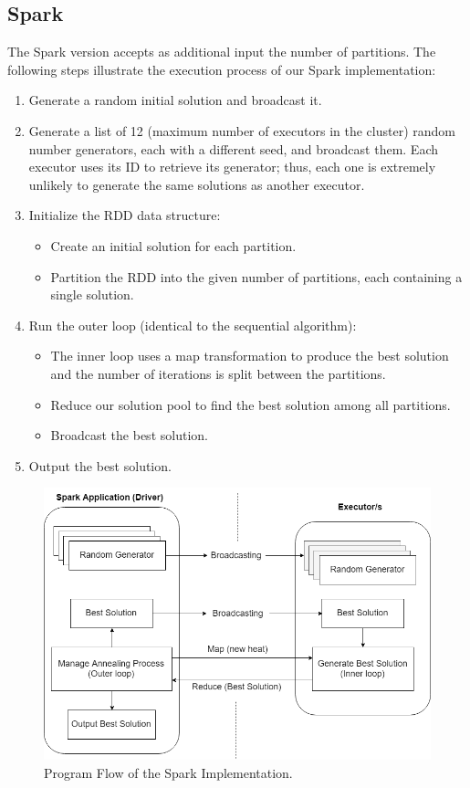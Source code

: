 \documentclass{article}
\begin{document}
		\subsection{Spark} \label{D_SPARK}
		The Spark version accepts as additional input the number of partitions. The following steps illustrate the execution process of our Spark implementation:
		\begin{enumerate}
			\item Generate a random initial solution and broadcast it.
			\item Generate a list of 12 (maximum number of executors in the cluster) random number generators, each with a different seed, and broadcast them. Each executor uses its ID to retrieve its generator; thus, each one is extremely unlikely to generate the same solutions as another executor.
			\item Initialize the RDD data structure:
				\begin{itemize} 
					\item Create an initial solution for each partition.
					\item Partition the RDD into the given number of partitions, each containing a single solution.
				\end{itemize}
			\item Run the outer loop (identical to the sequential algorithm):
				\begin{itemize} 
					\item The inner loop uses a map transformation to produce the best solution and the number of iterations is split between the partitions.
				    \item Reduce our solution pool to find the best solution among all partitions.
				    \item Broadcast the best solution.
				\end{itemize}
			\item Output the best solution.
		\end{enumerate}

		\begin{figure}\label{F3}
			\caption{Program Flow of the Spark Implementation.}
			\centering
			\includegraphics[scale=0.45]{spark_flow_diagram.png}
		\end{figure}
		
\end{document}
